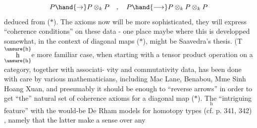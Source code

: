 \[ P \hand{\to} P\otimes_k P \quad , \quad P \hand{\longrightarrow} P\otimes_k P\otimes_k P \]
deduced from ($\ast$).  The axioms now will be more sophisticated,  they will
express ``coherence conditions'' on these data  -  one place maybe where
this is developped somewhat,  in the context of diagonal maps ($\ast$),
might be Saavedra's thesis.  (T\(\overset{\unsure{\text{h}}}{\underset{\unsure{\text{h}}}{\text{h}}}\)e  more familiar case,  when starting
with a tensor product operation on a category,  together with associati-%
vity and  commutativity data,  has been done with  care by various
mathematicians,  including Mac Lane, Benabou,  Mme Sinh Hoang Xuan,
and presumably it should be enough to ``reverse arrows'' in order to get
``the'' natural set of coherence axioms for a diagonal map ($\ast$)\hand{)}.  T\(\underset{\text{h}}{\text{h}}\)e
``intriguing feature''  with the would-be De Rham models for homotopy
types (cf. p. 341, 342) ,  namely that the latter make a sense over any


